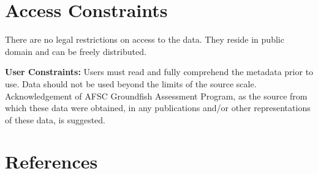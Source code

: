 \documentclass[
  letterpaper,
  oneside,
  open=any]{scrbook}
\begin{document}
\chapter{Access Constraints}\label{access-constraints-2}

There are no legal restrictions on access to the data. They reside in
public domain and can be freely distributed.

\textbf{User Constraints:} Users must read and fully comprehend the
metadata prior to use. Data should not be used beyond the limits of the
source scale. Acknowledgement of AFSC Groundfish Assessment Program, as
the source from which these data were obtained, in any publications
and/or other representations of these data, is suggested.

\chapter{References}\label{references}
\end{document}
